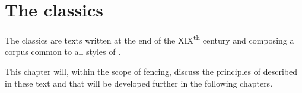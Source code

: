 \chapter{The \Taiji{} classics}\label{ch:classics}

The \Taiji{} classics are texts written at the end of the XIX\textsuperscript{th} century and composing a corpus common to all styles of \Taijiquan{}.

This chapter will, within the scope of fencing, discuss the principles of \Taiji{} described in these text and that will be developed further in the following chapters.